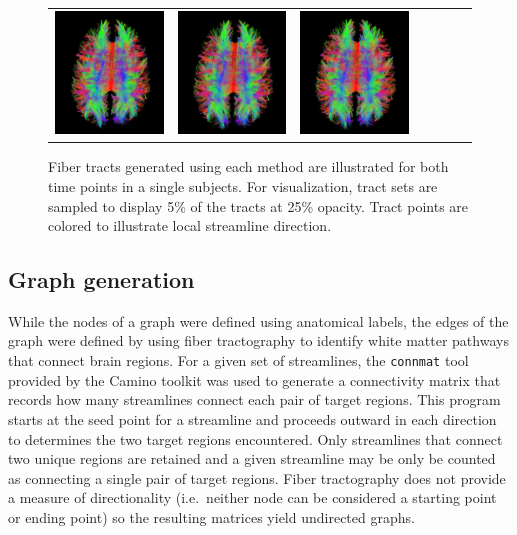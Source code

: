 \documentclass{frontiersSCNS} %
\begin{document}
\begin{figure}
\begin{center}
\begin{tabular}{ccccccc}
\includegraphics[width=0.25\linewidth]{figures/113_33_euler.png} & 
\includegraphics[width=0.25\linewidth]{figures/113_33_rk4.png} & 
\includegraphics[width=0.25\linewidth]{figures/113_33_tend.png} \\
\end{tabular}
\caption{Fiber tracts generated using each method are illustrated for both time points in a single subjects. For visualization, tract sets are sampled to display 5\% of the tracts at 25\% opacity. Tract points are colored to illustrate local streamline direction.}
\label{fig:tracts}
\end{center}
\end{figure}


\subsection{Graph generation}
While the nodes of a graph were defined using anatomical labels, the edges of the graph were defined by using
fiber tractography to identify white matter pathways that connect brain regions. 
For a given set of streamlines, the \texttt{connmat} tool provided by the Camino toolkit was used to generate
a connectivity matrix that records how many streamlines connect each pair of target regions. 
This program starts at the seed point for a streamline and proceeds outward in each
direction to determines the two target regions encountered. Only streamlines that connect two unique regions are retained and
a given streamline may be only be counted as connecting a single pair of target regions. Fiber tractography does not provide a measure
of directionality (i.e.\ neither node can be considered a starting point or ending point) so the resulting matrices yield undirected graphs.
\end{document}
